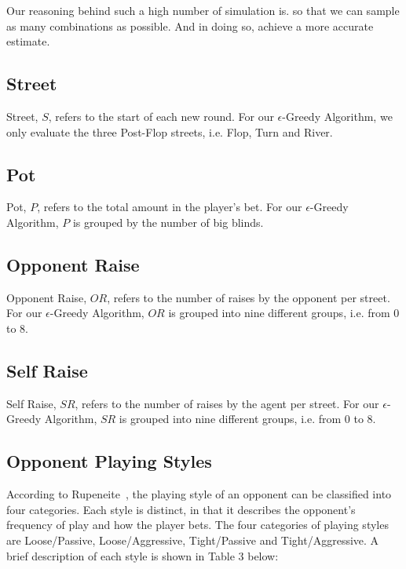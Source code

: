 \documentclass{article}
\begin{document}
\noindent Our reasoning behind such a high number of simulation is. so that we can sample as many combinations as possible. And in doing so, achieve a more accurate estimate.

\subsection{Street}

Street, $S$, refers to the start of each new round. For our $\epsilon$-Greedy Algorithm, we only evaluate the three Post-Flop streets, i.e. Flop, Turn and River. 

\subsection{Pot}

Pot, $P$, refers to the total amount in the player's bet. For our $\epsilon$-Greedy Algorithm, $P$ is grouped by the number of big blinds.

\subsection{Opponent Raise}

Opponent Raise, $OR$, refers to the number of raises by the opponent per street. For our $\epsilon$-Greedy Algorithm, $OR$ is grouped into nine different groups, i.e. from 0 to 8.

\subsection{Self Raise}

Self Raise, $SR$, refers to the number of raises by the agent per street. For our $\epsilon$-Greedy Algorithm, $SR$ is grouped into nine different groups, i.e. from 0 to 8.

\subsection{Opponent Playing Styles}

According to Rupeneite~, the playing style of an opponent can be classified into four categories. Each style is distinct, in that it describes the opponent's frequency of play and how the player bets. The four categories of playing styles are Loose/Passive, Loose/Aggressive, Tight/Passive and Tight/Aggressive. A brief description of each style is shown in Table 3 below:
\end{document}
